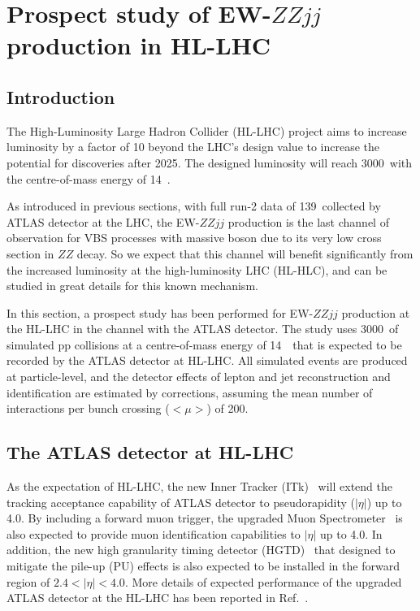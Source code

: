 \section{Prospect study of EW-$ZZjj$ production in HL-LHC}

\subsection{Introduction}
The High-Luminosity Large Hadron Collider (HL-LHC) project aims to increase luminosity by a factor of 10 beyond the LHC’s design value 
to increase the potential for discoveries after 2025.
The designed luminosity will reach 3000~\ifb with the centre-of-mass energy of 14~\tev.

As introduced in previous sections, with full run-2 data of 139~\ifb collected by ATLAS detector at the LHC, 
the EW-$ZZjj$ production is the last channel of observation for VBS processes with massive boson 
due to its very low cross section in $ZZ$ decay.
So we expect that this channel will benefit significantly from the increased luminosity at the high-luminosity LHC (HL-HLC),
and can be studied in great details for this known mechanism.

In this section, a prospect study has been performed for EW-$ZZjj$ production at the HL-LHC in the \llll channel with the ATLAS detector.
The study uses 3000~\ifb of simulated pp collisions at a centre-of-mass energy of 14~\tev~that is expected to be recorded by the ATLAS detector at HL-LHC.
All simulated events are produced at particle-level, 
and the detector effects of lepton and jet reconstruction and identification are estimated by corrections, 
assuming the mean number of interactions per bunch crossing ($<\mu>$) of 200.

\subsection{The ATLAS detector at HL-LHC}

As the expectation of HL-LHC, the new Inner Tracker (ITk)~\cite{Collaboration:2285585}
 will extend the tracking acceptance capability of ATLAS detector to pseudorapidity ($|\eta|$) up to 4.0.
By including a forward muon trigger, the upgraded Muon Spectrometer~\cite{Collaboration:2285580} is also expected to provide 
muon identification capabilities to $|\eta|$ up to 4.0.
In addition, the new high granularity timing detector (HGTD)~\cite{Collaboration:2623663} that designed to mitigate the pile-up (PU) effects 
is also expected to be installed in the forward region of $2.4 < |\eta| < 4.0$.
More details of expected performance of the upgraded ATLAS detector at the HL-LHC has been reported in Ref.~\cite{ATL-PHYS-PUB-2016-026}.

